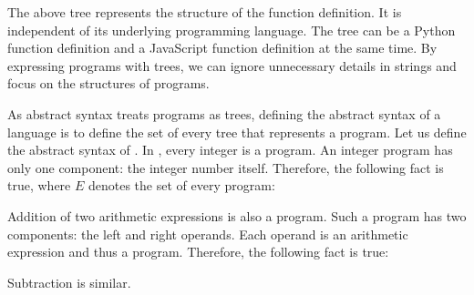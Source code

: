 The above tree represents the structure of the function definition. It is
independent of its underlying programming language. The tree can be a Python
function definition and a JavaScript function definition at the same time. By
expressing programs with trees, we can ignore unnecessary details in strings and
focus on the structures of programs.

As abstract syntax treats programs as trees, defining the abstract syntax of a
language is to define the set of every tree that represents a program. Let us
define the abstract syntax of \Lang. In \Lang, every integer is a
program. An integer program has only one component: the integer number
itself. Therefore, the following fact is true, where $E$ denotes the set of
every program:

\begin{center}
\end{center}

Addition of two arithmetic expressions is also a program. Such a program has
two components: the left and right operands. Each operand is an arithmetic
expression and thus a program. Therefore, the following fact is true:

\begin{center}
\end{center}

Subtraction is similar.

\begin{center}
\end{center}

